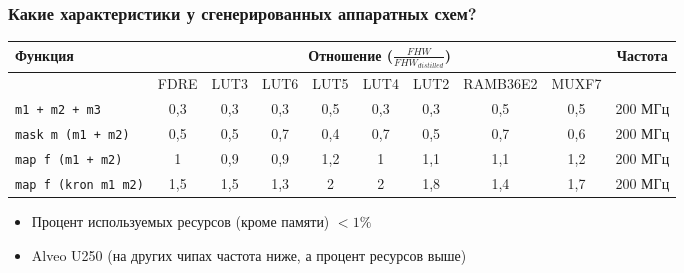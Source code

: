 \documentclass[xcolor=table,aspectratio=169]{beamer}
\begin{document}
\begin{frame}[fragile]\frametitle{Какие характеристики у сгенерированных аппаратных схем?}
\centering

\begin{table}[h]
\scriptsize
\centering
\begin{tabular}{|l|c|c|c|c|c|c|c|c|c|} 
\hline
\rowcolor{LightBlue}

{Функция} & \multicolumn{8}{c|}{Отношение (${\frac{FHW}{FHW_{distilled}}}$)} & {Частота}\\
\hline
{} & FDRE & LUT3 & LUT6 & LUT5 & LUT4 & LUT2 & RAMB36E2 & MUXF7 & {} \\
\hline
\texttt{m1 + m2 + m3} & 0{,}3 & 0{,}3 & 0{,}3 & 0{,}5 & 0{,}3 & 0{,}3 & 0{,}5 & 0{,}5 & 200 МГц\\ 
\texttt{mask m (m1 + m2)} & 0{,}5 & 0{,}5 & 0{,}7 & 0{,}4 & 0{,}7 & 0{,}5 & 0{,}7 & 0{,}6 & 200 МГц\\
\texttt{map f (m1 + m2)} & 1 & 0{,}9 & 0{,}9 & 1{,}2 & 1 & 1{,}1 & 1{,}1 & 1{,}2 & 200 МГц\\
\texttt{map f (kron m1 m2)} & 1{,}5 & 1{,}5 & 1{,}3 & 2 & 2 & 1{,}8 & 1{,}4 & 1{,}7 & 200 МГц\\
\hline
\end{tabular}
\end{table}

\begin{itemize}
    \item Процент используемых ресурсов (кроме памяти) $< 1\%$
    \vfill
    \item Alveo U250 (на других чипах частота ниже, а процент ресурсов выше)
\end{itemize}

\end{frame}





\end{document}
